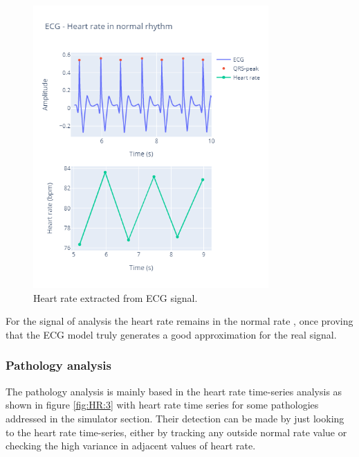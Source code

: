 \begin{figure}[h!] 
    \centering
    \includegraphics[width=9cm]{images/heart_rate/heart_rate_software.png}
    \caption{Heart rate extracted from ECG signal.}
    \label{fig:HR:2}
\end{figure}

 For the signal of analysis the heart rate remains in the normal rate \cite{clevelandclinic}, once proving that the ECG model truly generates a good approximation for the real signal.

\subsubsection{Pathology analysis}

The pathology analysis is mainly based in the heart rate time-series analysis as shown in figure \ref{fig:HR:3} with heart rate time series for some pathologies addressed in the simulator section. Their detection can be made by just looking to the heart rate time-series, either by tracking any outside normal rate value or checking the high variance in adjacent values of heart rate.

